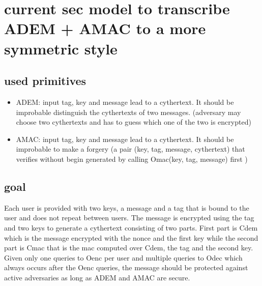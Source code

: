 \documentclass{article}
\begin{document}
\section{current sec model to transcribe ADEM + AMAC to a more symmetric style}
\subsection{used primitives}
\begin{itemize}
    \item ADEM: input tag, key and message lead to a cythertext. It should be improbable distinguish the cythertexts of two messages. (adversary may choose two cythertexts and has to guess which one of the two is encrypted)
    
    \item AMAC: input tag, key and message lead to a cythertext. It should be improbable to make a forgery (a pair (key, tag, message, cythertext) that verifies without begin generated by calling Omac(key, tag, message) first )
\end{itemize}

\subsection{goal}
Each user is provided with two keys, a message and a tag that is bound to the user and does not repeat between users. The message is encrypted using the tag and two keys to generate a cythertext consisting of two parts. First part is Cdem which is the message encrypted with the nonce and the first key while the second part is Cmac that is the mac computed over Cdem, the tag and the second key. Given only one queries to Oenc per user and multiple queries to Odec which always occurs after the Oenc queries, the message should be protected against active adversaries as long as ADEM and AMAC are secure.
\end{document}
